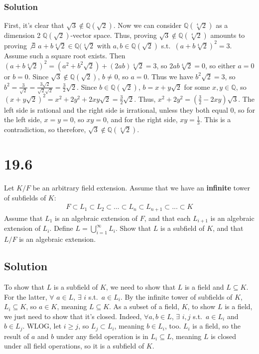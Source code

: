 \documentclass[fleqn]{article}
\begin{document}
            \subsubsection{Solution}
            First, it's clear that $\sqrt{3} \notin \mathbb{Q}(\sqrt{2})$.  Now we can consider $\mathbb{Q}(\sqrt[4]{2})$ as a dimension 2 $\mathbb{Q}(\sqrt{2})$-vector space.  Thus, proving $\sqrt{3} \notin \mathbb{Q}(\sqrt[4]{2})$ amounts to proving $\not\exists$ $a + b \sqrt[4]{2} \in \mathbb{Q}(\sqrt[4]{2}$ with $a, b \in \mathbb{Q}(\sqrt{2})$ s.t.\ $\left(a + b \sqrt[4]{2}\right)^2 = 3$.  Assume such a square root exists.  Then $\left(a + b \sqrt[4]{2}\right)^2 = \left(a^2 + b^2 \sqrt{2}\right) + (2ab) \sqrt[4]{2} = 3$, so $2ab \sqrt[4]{2} = 0$, so either $a = 0$ or $b = 0$.  Since $\sqrt{3} \notin \mathbb{Q}(\sqrt{2})$, $b \neq 0$, so $a = 0$.  Thus we have $b^2 \sqrt{2} = 3$, so $b^2 = \frac{3}{\sqrt{2}} = \frac{3 \sqrt{2}}{\sqrt{2} \sqrt{2}} = \frac{3}{2} \sqrt{2}$.  Since $b \in \mathbb{Q}(\sqrt{2})$, $b = x + y \sqrt{2}$ for some $x, y \in \mathbb{Q}$, so $\left(x + y \sqrt{2}\right)^2 = x^2 + 2y^2 + 2xy \sqrt{2} = \frac{3}{2} \sqrt{2}$.  Thus, $x^2 + 2y^2 = \left(\frac{3}{2} - 2xy\right) \sqrt{3}$.  The left side is rational and the right side is irrational, unless they both equal 0, so for the left side, $x = y = 0$, so $xy = 0$, and for the right side, $xy = \frac{1}{3}$.  This is a contradiction, so therefore, $\sqrt{3} \notin \mathbb{Q}(\sqrt[4]{2})$.
    
    \section{19.6}
    Let $K/F$ be an arbitrary field extension.  Assume that we have an \textbf{infinite} tower of subfields of $K$:
    \begin{align}
        F \subset L_1 \subset L_2 \subset ... \subset L_n \subset L_{n + 1} \subset ... \subset K
    \end{align}
    Assume that $L_1$ is an algebraic extension of $F$, and that each $L_{i + 1}$ is an algebraic extension of $L_i$.  Define $L = \bigcup\limits_{i = 1}^{\infty} L_i$.  Show that $L$ is a subfield of $K$, and that $L/F$ is an algebraic extension.
        
        \subsection{Solution}
        To show that $L$ is a subfield of $K$, we need to show that $L$ is a field and $L \subseteq K$.  For the latter, $\forall$ $a \in L$, $\exists$ $i$ s.t.\ $a \in L_i$.  By the infinite tower of subfields of $K$, $L_i \subseteq K$, so $a \in K$, meaning $L \subseteq K$.  As a subset of a field, $K$, to show $L$ is a field, we just need to show that it's closed.  Indeed, $\forall a, b \in L$, $\exists$ $i, j$ s.t.\ $a \in L_i$ and $b \in L_j$.  WLOG, let $i \geq j$, so $L_j \subset L_i$, meaning $b \in L_i$, too.  $L_i$ is a field, so the result of $a$ and $b$ under any field operation is in $L_i \subseteq L$, meaning $L$ is closed under all field operations, so it is a subfield of $K$.
        
\end{document}
